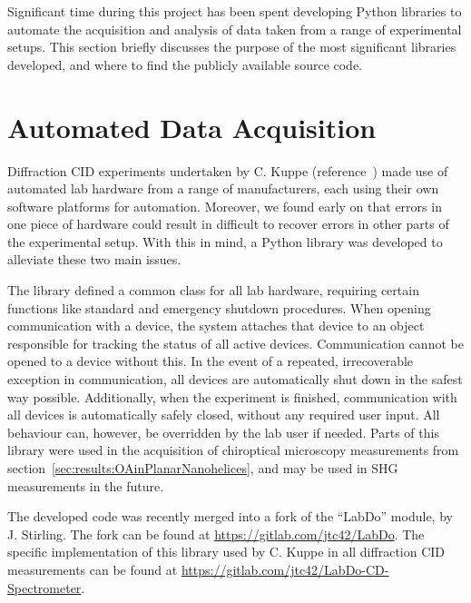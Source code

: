 Significant time during this project has been spent developing Python libraries to automate the acquisition and analysis of data taken from a range of experimental setups. This section briefly discusses the purpose of the most significant libraries developed, and where to find the publicly available source code.

\section{Automated Data Acquisition}\label{sec:appendix:labdo}
Diffraction CID experiments undertaken by C. Kuppe (reference~\cite{Kuppe2018}) made use of automated lab hardware from a range of manufacturers, each using their own software platforms for automation. Moreover, we found early on that errors in one piece of hardware could result in difficult to recover errors in other parts of the experimental setup. With this in mind, a Python library was developed to alleviate these two main issues. 

The library defined a common class for all lab hardware, requiring certain functions like standard and emergency shutdown procedures. When opening communication with a device, the system attaches that device to an object responsible for tracking the status of all active devices. Communication cannot be opened to a device without this. In the event of a repeated, irrecoverable exception in communication, all devices are automatically shut down in the safest way possible. Additionally, when the experiment is finished, communication with all devices is automatically safely closed, without any required user input. All behaviour can, however, be overridden by the lab user if needed. 
Parts of this library were used in the acquisition of chiroptical microscopy measurements from section~\ref{sec:results:OAinPlanarNanohelices}, and may be used in SHG measurements in the future.

The developed code was recently merged into a fork of the ``LabDo'' module, by J. Stirling. The fork can be found at \url{https://gitlab.com/jtc42/LabDo}.
The specific implementation of this library used by C. Kuppe in all diffraction CID measurements can be found at \url{https://gitlab.com/jtc42/LabDo-CD-Spectrometer}.


